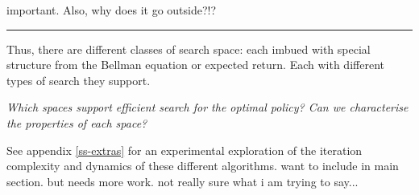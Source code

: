 {\color{red}important. Also, why does it go outside?!?}

\newpage

\begin{center}\rule{0.5\linewidth}{\linethickness}\end{center}

Thus, there are different classes of search space: each imbued with special
structure from the Bellman equation or expected return. Each with different types of search they
support.

\begin{displayquote}
\textit{Which spaces support efficient search for the optimal policy? Can we characterise the properties of each space?}
\end{displayquote}

See appendix \ref{ss-extras} for an experimental exploration of the iteration complexity and dynamics of these different algorithms.
{\color{red}want to include in main section. but needs more work. not really sure what i am trying to say...}
